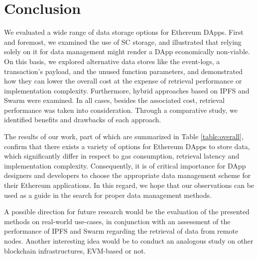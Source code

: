 \chapter{Conclusion}\label{chapter:Conclusion}
We evaluated a wide range of data storage options for Ethereum DApps. 
First and foremost, we examined the use of SC storage, and illustrated that relying solely on it for data management might render a DApp economically non-viable. On this basis, we explored alternative data stores like the event-logs, a transaction’s payload, and the unused function parameters, and demonstrated how they can lower the overall cost at the expense of retrieval performance or implementation complexity. Furthermore, hybrid approaches based on IPFS and Swarm were examined. In all cases, besides the associated cost, retrieval performance was taken into consideration. Through a comparative study, we identified benefits and drawbacks of each approach. 




The results of our work, part of which are summarized in Table \ref{table:overall}, confirm that there exists a variety of options for Ethereum DApps to store data, which significantly differ in respect to gas consumption, retrieval latency and implementation complexity. Consequently, it is of critical importance for DApp designers and developers to choose the appropriate data management scheme for their Ethereum applications. In this regard, we hope that our observations can be used as a guide in the search for proper data management methods.


A possible direction for future research would be the evaluation of the presented methods on real-world use-cases, in conjunction with an assessment of the performance of IPFS and Swarm regarding the retrieval of data from remote nodes. Another interesting idea would be to conduct an analogous study on other blockchain infrastructures, EVM-based or not.